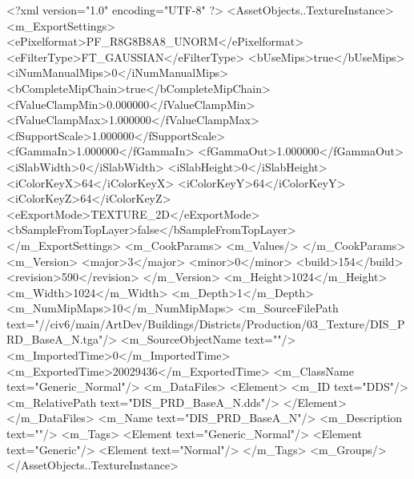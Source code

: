 <?xml version="1.0" encoding="UTF-8" ?>
<AssetObjects..TextureInstance>
	<m_ExportSettings>
		<ePixelformat>PF_R8G8B8A8_UNORM</ePixelformat>
		<eFilterType>FT_GAUSSIAN</eFilterType>
		<bUseMips>true</bUseMips>
		<iNumManualMips>0</iNumManualMips>
		<bCompleteMipChain>true</bCompleteMipChain>
		<fValueClampMin>0.000000</fValueClampMin>
		<fValueClampMax>1.000000</fValueClampMax>
		<fSupportScale>1.000000</fSupportScale>
		<fGammaIn>1.000000</fGammaIn>
		<fGammaOut>1.000000</fGammaOut>
		<iSlabWidth>0</iSlabWidth>
		<iSlabHeight>0</iSlabHeight>
		<iColorKeyX>64</iColorKeyX>
		<iColorKeyY>64</iColorKeyY>
		<iColorKeyZ>64</iColorKeyZ>
		<eExportMode>TEXTURE_2D</eExportMode>
		<bSampleFromTopLayer>false</bSampleFromTopLayer>
	</m_ExportSettings>
	<m_CookParams>
		<m_Values/>
	</m_CookParams>
	<m_Version>
		<major>3</major>
		<minor>0</minor>
		<build>154</build>
		<revision>590</revision>
	</m_Version>
	<m_Height>1024</m_Height>
	<m_Width>1024</m_Width>
	<m_Depth>1</m_Depth>
	<m_NumMipMaps>10</m_NumMipMaps>
	<m_SourceFilePath text="//civ6/main/ArtDev/Buildings/Districts/Production/03_Texture/DIS_PRD_BaseA_N.tga"/>
	<m_SourceObjectName text=""/>
	<m_ImportedTime>0</m_ImportedTime>
	<m_ExportedTime>20029436</m_ExportedTime>
	<m_ClassName text="Generic_Normal"/>
	<m_DataFiles>
		<Element>
			<m_ID text="DDS"/>
			<m_RelativePath text="DIS_PRD_BaseA_N.dds"/>
		</Element>
	</m_DataFiles>
	<m_Name text="DIS_PRD_BaseA_N"/>
	<m_Description text=""/>
	<m_Tags>
		<Element text="Generic_Normal"/>
		<Element text="Generic"/>
		<Element text="Normal"/>
	</m_Tags>
	<m_Groups/>
</AssetObjects..TextureInstance>

